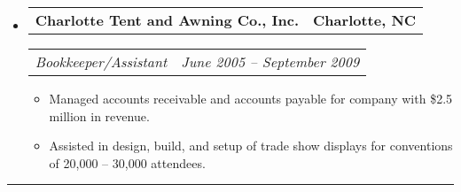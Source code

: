 \documentclass[10pt,letterpaper]{article}
\makeatletter
\newcommand{\headerrow}[2]
{\begin{tabular*}{\linewidth}{l@{\extracolsep{\fill}}r}
	#1 & #2 \\
\end{tabular*}}
\makeatother
\begin{document}
\begin{itemize}
	\item
	\headerrow
		{\textbf{Charlotte Tent and Awning Co., Inc.}}
		{\textbf{Charlotte, NC}}
	\headerrow
		{\emph{Bookkeeper/Assistant}}
		{\emph{June 2005 -- September 2009}}
	\begin{itemize}
        \item Managed accounts receivable and accounts payable for company with
            \$2.5 million in revenue.

        \item Assisted in design, build, and setup of trade show displays for
            conventions of 20,000 -- 30,000 attendees.
	\end{itemize}

\end{itemize}

\hrule
\vspace{-0.4em}
\end{document}
